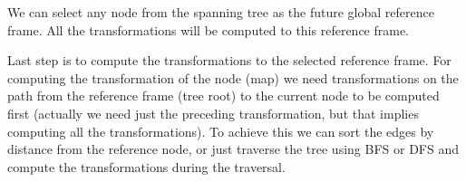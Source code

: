We can select any node from the spanning tree as the future global reference frame. All the transformations will be computed to this reference frame.

Last step is to compute the transformations to the selected reference frame. For computing the transformation of the node (map) we need transformations on the path from the reference frame (tree root) to the current node to be computed first (actually we need just the preceding transformation, but that implies computing all the transformations). To achieve this we can sort the edges by distance from the reference node, or just traverse the tree using \gls{BFS} or \gls{DFS} and compute the transformations during the traversal.


